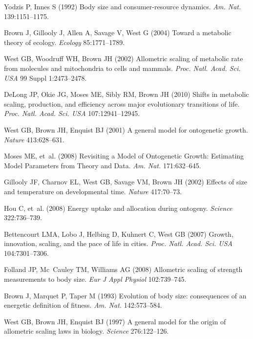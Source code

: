\documentclass{pnastwo}
\begin{document}
\begin{article}
{\begin{thebibliography}{10}
Yodzis P, Innes S
\newblock (1992) {Body size and consumer-resource dynamics}.
\newblock \emph{Am. Nat.} 139:1151--1175.

Brown J, Gillooly J, Allen A, Savage V, West G
\newblock (2004) {Toward a metabolic theory of ecology}.
\newblock \emph{Ecology} 85:1771--1789.

West GB, Woodruff WH, Brown JH
\newblock (2002) {Allometric scaling of metabolic rate from molecules and
  mitochondria to cells and mammals.}
\newblock \emph{Proc. Natl. Acad. Sci. USA} 99 Suppl 1:2473--2478.

DeLong JP, Okie JG, Moses ME, Sibly RM, Brown JH
\newblock (2010) {Shifts in metabolic scaling, production, and efficiency
  across major evolutionary transitions of life}.
\newblock \emph{Proc. Natl. Acad. Sci. USA} 107:12941--12945.

West GB, Brown JH, Enquist BJ
\newblock (2001) {A general model for ontogenetic growth}.
\newblock \emph{Nature} 413:628--631.

Moses ME, {et~al.}
\newblock (2008) {Revisiting a Model of Ontogenetic Growth: Estimating Model
  Parameters from Theory and Data.}
\newblock \emph{Am. Nat.} 171:632--645.

Gillooly JF, Charnov EL, West GB, Savage VM, Brown JH
\newblock (2002) {Effects of size and temperature on developmental time}.
\newblock \emph{Nature} 417:70--73.

Hou C, {et~al.}
\newblock (2008) {Energy uptake and allocation during ontogeny}.
\newblock \emph{Science} 322:736--739.

Bettencourt LMA, Lobo J, Helbing D, Kuhnert C, West GB
\newblock (2007) {Growth, innovation, scaling, and the pace of life in cities}.
\newblock \emph{Proc. Natl. Acad. Sci. USA} 104:7301--7306.

Folland JP, Mc~Cauley TM, Williams AG
\newblock (2008) {Allometric scaling of strength measurements to body size}.
\newblock \emph{Eur J Appl Physiol} 102:739--745.

Brown J, Marquet P, Taper M
\newblock (1993) {Evolution of body size: consequences of an energetic
  definition of fitness}.
\newblock \emph{Am. Nat.} 142:573--584.

West GB, Brown JH, Enquist BJ
\newblock (1997) {A general model for the origin of allometric scaling laws in
  biology}.
\newblock \emph{Science} 276:122--126.


\end{thebibliography}}
\end{article}
\end{document}
